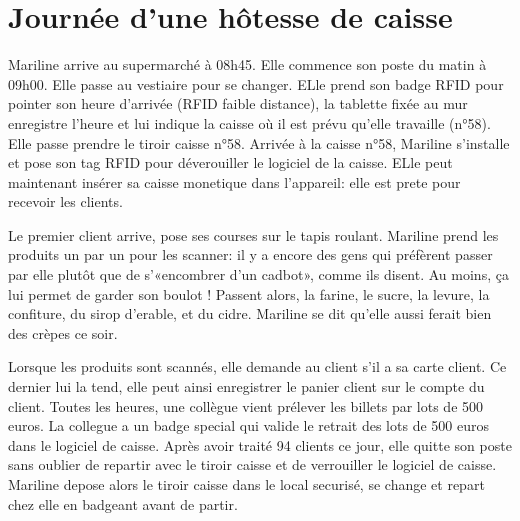 \section{Journée d'une hôtesse de caisse}

Mariline arrive au supermarché à 08h45. 
Elle commence son poste du matin à 09h00. 
Elle passe au vestiaire pour se changer. 
ELle prend son badge RFID pour pointer son heure d'arrivée (RFID faible distance), la tablette fixée au mur enregistre l'heure et lui indique la caisse où il est prévu qu'elle travaille (n°58).
Elle passe prendre le tiroir caisse n°58.
Arrivée à la caisse n°58, Mariline s'installe et pose son tag RFID pour déverouiller le logiciel de la caisse. 
ELle peut maintenant insérer sa caisse monetique dans l'appareil: elle est prete pour recevoir les clients. 
\par
Le premier client arrive, pose ses courses sur le tapis roulant. 
Mariline prend les produits un par un pour les scanner: il y a encore des gens qui préfèrent passer par elle plutôt que de s'«encombrer d'un cadbot», comme ils disent.
Au moins, ça lui permet de garder son boulot !
Passent alors, la farine, le sucre, la levure, la confiture, du sirop d'erable, et du cidre. 
Mariline se dit qu'elle aussi ferait bien des crèpes ce soir. 
\par
Lorsque les produits sont scannés, elle demande au client s'il a sa carte client. 
Ce dernier lui la tend, elle peut ainsi enregistrer le panier client sur le compte du client.
Toutes les heures, une collègue vient prélever les billets par lots de 500 euros. 
La collegue a un badge special qui valide le retrait des lots de 500 euros dans le logiciel de caisse. 
Après avoir traité 94 clients ce jour, elle quitte son poste sans oublier de repartir avec le tiroir caisse et de verrouiller le logiciel de caisse. 
Mariline depose alors le tiroir caisse dans le local securisé, se change et repart chez elle en badgeant avant de partir.
